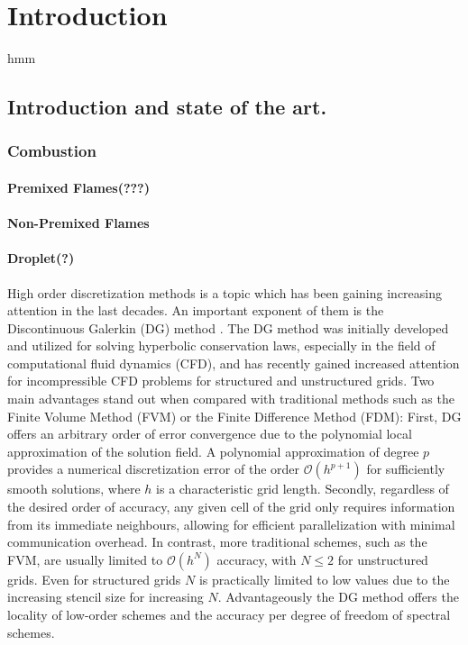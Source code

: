 \chapter{Introduction}	\label{ch:introduction}

hmm
\section{Introduction and state of the art.}
\subsection{Combustion}
\subsubsection{Premixed Flames(???)}
\subsubsection{Non-Premixed Flames}
\subsubsection{Droplet(?)}



High order discretization methods is a topic which has been gaining increasing attention in the last decades. An important exponent of them is the Discontinuous Galerkin (DG) method \cite{cockburnDevelopmentDiscontinuousGalerkin2000}. The DG method was initially developed and utilized for solving hyperbolic conservation laws, especially in the field of computational fluid dynamics (CFD), and has recently gained increased attention for incompressible CFD problems for structured and unstructured grids. Two main advantages stand out when compared with traditional methods such as the Finite Volume Method (FVM) or the Finite Difference Method (FDM): First, DG offers an arbitrary order of error convergence due to the polynomial local approximation of the solution field. A polynomial approximation of degree $p$ provides a numerical discretization error of the order  $\mathcal{O}(h^{p+1})$ for sufficiently smooth solutions, where $h$ is a characteristic grid length.
Secondly, regardless of the desired order of accuracy, any given cell of the grid only requires information from its immediate neighbours, allowing for efficient parallelization with minimal communication overhead. In contrast, more traditional schemes, such as the FVM, are usually limited to $\mathcal{O}(h^N)$ accuracy, with $N \leq 2$ for unstructured grids. Even for structured grids $N$ is practically limited to low values due to the increasing stencil size for increasing $N$. Advantageously the DG method offers the locality of low-order schemes and the accuracy per degree of freedom of spectral schemes.

